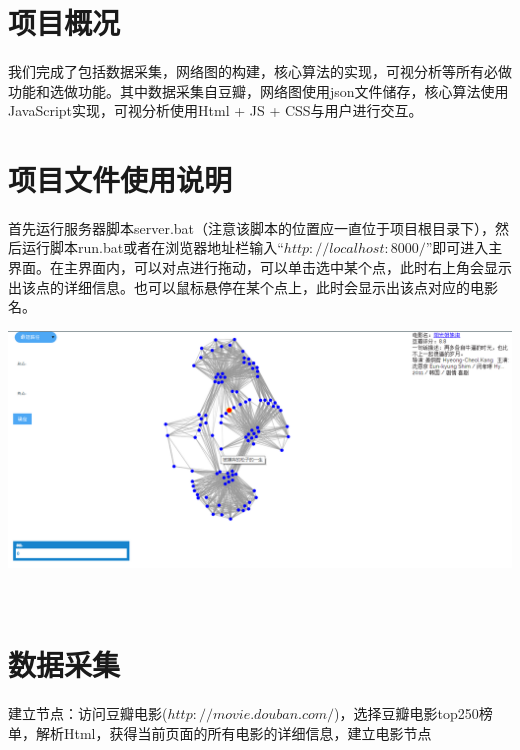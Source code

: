 \documentclass{article}
\begin{document}
\begin{CJK}{UTF8}{gkai}
\section{项目概况} %
	\paragraph{}
	我们完成了包括数据采集，网络图的构建，核心算法的实现，可视分析等所有必做功能和选做功能。其中数据采集自豆瓣，网络图使用json文件储存，核心算法使用JavaScript实现，可视分析使用Html + JS + CSS与用户进行交互。

\section{项目文件使用说明} %
	\paragraph{}
	首先运行服务器脚本server.bat（注意该脚本的位置应一直位于项目根目录下），然后运行脚本run.bat或者在浏览器地址栏输入“$http://localhost:8000/$”即可进入主界面。在主界面内，可以对点进行拖动，可以单击选中某个点，此时右上角会显示出该点的详细信息。也可以鼠标悬停在某个点上，此时会显示出该点对应的电影名。
	\\[\intextsep] 
	\begin{minipage}{\textwidth} 
	    \centering 
	    \includegraphics[width=0.6\linewidth]{click.PNG}
	\end{minipage} 
	\\[\intextsep] 


\section{数据采集} %
	\paragraph{}
	建立节点：访问豆瓣电影($http://movie.douban.com/$)，选择豆瓣电影top250榜单，解析Html，获得当前页面的所有电影的详细信息，建立电影节点

\end{CJK}
\end{document}
